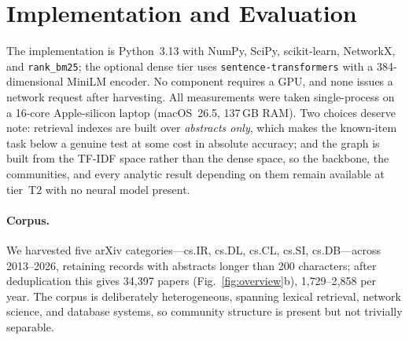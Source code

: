 \documentclass[runningheads]{llncs}
\begin{document}
\section{Implementation and Evaluation}
\label{sec:impl}

The implementation is Python~3.13 with NumPy, SciPy, scikit-learn, NetworkX, and
\texttt{rank\_bm25}; the optional dense tier uses \texttt{sentence-transformers} with a
384-dimensional MiniLM encoder. No component requires a GPU, and none issues a network
request after harvesting. All measurements were taken single-process on a 16-core
Apple-silicon laptop (macOS~26.5, 137\,GB RAM). Two choices deserve note: retrieval
indexes are built over \emph{abstracts only}, which makes the known-item task below a
genuine test at some cost in absolute accuracy; and the graph is built from the TF-IDF
space rather than the dense space, so the backbone, the communities, and every analytic
result depending on them remain available at tier~T2 with no neural model present.

\paragraph{Corpus.}
We harvested five arXiv categories---cs.IR, cs.DL, cs.CL, cs.SI, cs.DB---across
2013--2026, retaining records with abstracts longer than 200 characters; after
deduplication this gives 34{,}397 papers (Fig.~\ref{fig:overview}b), 1{,}729--2{,}858 per
year. The corpus is deliberately heterogeneous, spanning lexical retrieval, network
science, and database systems, so community structure is present but not trivially
separable.
\end{document}
